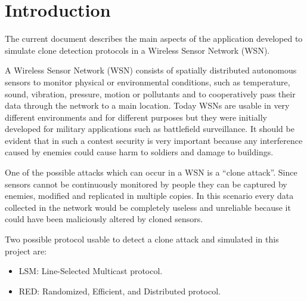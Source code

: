 \section{Introduction}
The current document describes the main aspects of the application developed
to simulate clone detection protocols in a Wireless Sensor Network (WSN).

A Wireless Sensor Network (WSN) consists of spatially distributed autonomous 
sensors to monitor physical or environmental conditions, such as temperature, 
sound, vibration, pressure, motion or pollutants and to cooperatively pass 
their data through the network to a main location. 
Today WSNs are usable in very different environments and for different purposes
but they were initially developed for military applications such as battlefield
surveillance. It should be evident that in such a contest security is very important because any interference caused by enemies could cause harm to soldiers and 
damage to buildings.

One of the possible attacks which can occur in a WSN is a ``clone attack''. 
Since sensors cannot be continuously monitored by people they can be captured 
by enemies, modified and replicated in multiple copies. In this scenario
every data collected in the network would be completely useless and unreliable 
because it could have been maliciously altered by cloned sensors.

Two possible protocol usable to detect a clone attack and simulated in this 
project are:
\begin{itemize}
  \item LSM: Line-Selected Multicast protocol.
  \item RED: Randomized, Efficient, and Distributed protocol.
\end{itemize}

